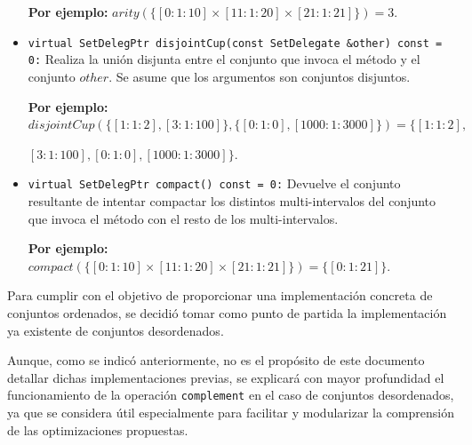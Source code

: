 \begin{itemize}
    \begin{center}
        \textbf{Por ejemplo:} $arity(\{[0: 1: 10] \times [11: 1: 20] \times [21: 1: 21]\})=3$.
    \end{center}
    
    \item \texttt{virtual SetDelegPtr disjointCup(const SetDelegate \&other) const = 0:}  
    Realiza la unión disjunta entre el conjunto que invoca el método y el conjunto $other$. Se asume que los argumentos son conjuntos disjuntos.

    \begin{center}
        \textbf{Por ejemplo:} $disjointCup(\{[1: 1: 2], [3: 1: 100]\},\{[0: 1: 0],[1000: 1: 3000]\})=\{[1: 1: 2],$
        
        $ [3: 1: 100],[0: 1: 0],[1000: 1: 3000]\}$.
    \end{center}
    

    \item \texttt{virtual SetDelegPtr compact() const = 0:}  
    Devuelve el conjunto resultante de intentar compactar los distintos multi-intervalos del conjunto que invoca el método con el resto de los multi-intervalos.

    \begin{center}
        \textbf{Por ejemplo:} $compact(\{[0: 1: 10] \times [11: 1: 20] \times [21: 1: 21]\})= \{[0: 1: 21]\}$.
    \end{center}

\end{itemize}


Para cumplir con el objetivo de proporcionar una implementación concreta de conjuntos ordenados, se decidió tomar como punto de partida la implementación ya existente de conjuntos desordenados. 

Aunque, como se indicó anteriormente, no es el propósito de este documento detallar dichas implementaciones previas, se explicará con mayor profundidad el funcionamiento de la operación \texttt{complement} en el caso de conjuntos desordenados, ya que se considera útil especialmente para facilitar y modularizar la comprensión de las optimizaciones propuestas.


